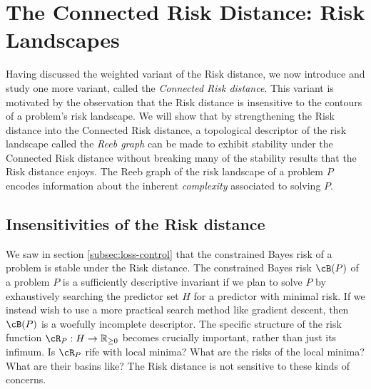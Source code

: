 \documentclass[twoside,11pt]{article}
\newcommand{\facundo}[1]                {{\textcolor{red} {#1}}}
\newcommand{\brantley}[1]                {{\textcolor{blue} {#1}}}
\begin{document}
\section{The Connected Risk Distance: Risk Landscapes}\label{sec:topological}

Having discussed the weighted variant of the Risk distance, we now introduce and study one more variant, called the \emph{Connected Risk distance}. This variant is motivated by the observation that the Risk distance is insensitive to the contours of a problem's risk landscape. We will show that by strengthening the Risk distance into the Connected Risk distance, a topological descriptor of the risk landscape called the \emph{Reeb graph} can be made to exhibit stability under the Connected Risk distance without breaking many of the stability results that the Risk distance enjoys. The Reeb graph of the risk landscape of a problem $P$ encodes information about the inherent \emph{complexity} associated to solving $P$.

\subsection{Insensitivities of the Risk distance}

We saw in section \ref{subsec:loss-control} that the constrained Bayes risk of a problem is stable under the Risk distance. The constrained Bayes risk $\cB(P)$ of a problem $P$ is a sufficiently descriptive invariant if we plan to solve $P$ by exhaustively searching the predictor set $H$ for a predictor with minimal risk. If we instead wish to use a more practical search method like gradient descent, then $\cB(P)$ is a woefully incomplete descriptor. The specific structure of the risk function $\cR_P:H\to \mathbb R_{\geq 0}$ becomes crucially important, rather than just its infimum. Is $\cR_P$ rife with local minima? What are the risks of the local minima? What are their basins like? The Risk distance is not sensitive to these kinds of concerns.
\end{document}
